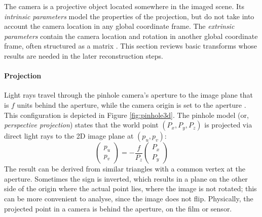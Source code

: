 
The camera is a projective object located somewhere in the imaged scene.
Its \emph{intrinsic parameters} model the properties of the projection, but do not take into account the camera location in any global coordinate frame.
The \emph{extrinsic parameters} contain the camera location and rotation in another global coordinate frame, often structured as a matrix \cite[p.~41]{hartley03multiview}.
This section reviews basic transforms whose results are needed in the later reconstruction steps.


\paragraph{Projection}
Light rays travel through the pinhole camera's aperture to the image plane that is $f$ units behind the aperture, while the camera origin is set to the aperture \cite{hartley03multiview}.
This configuration is depicted in Figure \ref{fig:pinhole3d}.
The pinhole model (or, \emph{perspective projection}) states that the world point $(P_x, P_y, P_z)$ is projected via direct light rays to the 2D image plane at $(p_u, p_v)$:
\begin{equation}
\begin{pmatrix}
p_u \\ p_v
\end{pmatrix}
=
-\frac{f}{P_z} \begin{pmatrix}
P_x \\ P_y
\end{pmatrix}
\end{equation}
The result can be derived from similar triangles with a common vertex at the aperture.
Sometimes the sign is inverted, which results in a plane on the other side of the origin where the actual point lies, where the image is not rotated; this can be more convenient to analyse, since the image does not flip.
Physically, the projected point in a camera is behind the aperture, on the film or sensor.

